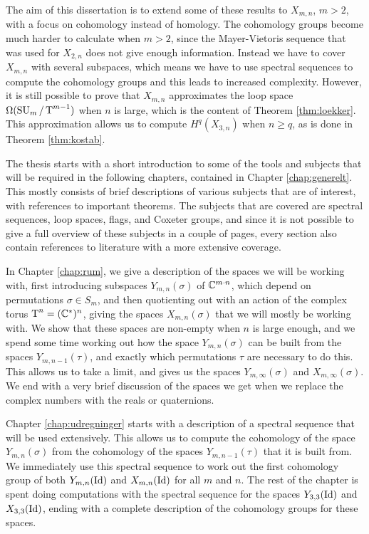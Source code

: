 The aim of this dissertation is to extend some of
these results to $X_{m,n}$, $m > 2$, with a focus on cohomology
instead of homology. The cohomology groups become much harder to
calculate when $m > 2$, since the Mayer-Vietoris sequence that was
used for $X_{2,n}$
does not give enough information. Instead we have to cover $X_{m,n}$
with several subspaces, which means we have to use spectral
sequences to compute the cohomology groups and this leads to increased
complexity. However, it is still possible to prove that $X_{m,n}$
approximates the loop space $\Omega(\operatorname{SU}_{m}/\operatorname{T}^{m-1})$ when $n$ is large, which
is the content of Theorem \ref{thm:loekker}. This approximation allows
us to compute $H^q(X_{3,n})$ when $n \geq q$, as is done in Theorem
\ref{thm:kostab}.

The thesis starts with a short introduction to some of the tools and
subjects that
will be required in the following chapters, contained in Chapter
\ref{chap:generelt}. This mostly consists of brief descriptions of
various subjects that are of interest, with references to
important theorems. The subjects that are covered are spectral
sequences, loop spaces, flags, and Coxeter groups, and since it is not
possible to give a full overview of these subjects in a couple of
pages, every section also contain references to literature with a
more extensive coverage.

In Chapter \ref{chap:rum}, we give a description of the spaces we will
be working with, first introducing subspaces $Y_{m,n}(\sigma)$ of
$\mathbb{C}^{m\cdot n}$, which depend on permutations $\sigma\in S_m$, and
then quotienting out with an action of the complex torus $\operatorname{T}^n =
(\mathbb{C}^*)^n$, giving the spaces $X_{m,n}(\sigma)$ that we will mostly be
working with. We show that these spaces are non-empty when $n$ is
large enough, and we spend some time working out how the space
$Y_{m,n}(\sigma)$ can be built from the spaces $Y_{m,n-1}(\tau)$, and
exactly which permutations $\tau$ are necessary to do this. This
allows us to take a limit, and gives us the spaces
$Y_{m,\infty}(\sigma)$ and $X_{m,\infty}(\sigma)$. We end
with a very brief discussion of the spaces we get when we replace the
complex numbers with the reals or quaternions.

Chapter \ref{chap:udregninger} starts with a description of a spectral
sequence that will be used extensively. This allows us to compute the
cohomology of the space $Y_{m,n}(\sigma)$ from the cohomology of the
spaces $Y_{m,n-1}(\tau)$ that it is built from. We immediately use
this spectral sequence to work out the first cohomology group of both
$Y_{m,n}(\operatorname{Id})$ and $X_{m,n}(\operatorname{Id})$ for all $m$ and $n$. The rest of the
chapter is spent doing computations with the spectral sequence for the
spaces $Y_{3,3}(\operatorname{Id})$ and
$X_{3,3}(\operatorname{Id})$, ending with a complete description of the cohomology
groups for these spaces.

